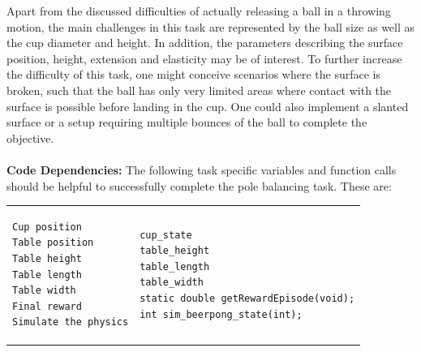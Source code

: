 \documentclass[11pt, article, colorback]{article}
\begin{document}
Apart from the discussed difficulties of actually releasing a ball in a throwing motion, the main challenges in this task 
are represented by the ball size as well as the cup diameter and height. In addition, the parameters describing the 
surface position, height, extension and elasticity may be of interest. To further increase the difficulty of this task, one 
might conceive scenarios where the surface is broken, such that the ball has only very limited areas where contact 
with the surface is possible before landing in the cup. One could also implement a slanted surface or a setup requiring 
multiple bounces of the ball to complete the objective. 
		\\  \\
%
\textbf{Code Dependencies:} The following task specific variables and function calls should be helpful to 
successfully complete the pole balancing task. These are: \\
\begin{tabular}{ m{7cm} m{4cm}}
\begin{lstlisting}
Cup position
Table position
Table height
Table length
Table width
Final reward
Simulate the physics
\end{lstlisting}
& \begin{lstlisting}
cup_state
table_height
table_length
table_width
static double getRewardEpisode(void);
int sim_beerpong_state(int);
\end{lstlisting}
\end{tabular} \\
\end{document}
